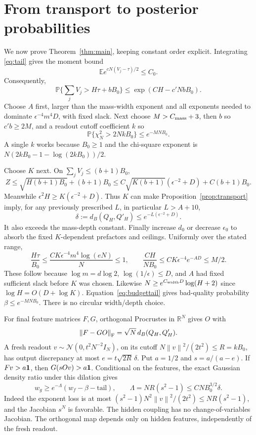 \documentclass[11pt]{article}
\newcommand{\R}{\mathbb R}\newcommand{\E}{\mathbb E}\newcommand{\Pp}{\mathbb P}
\newcommand{\norm}[1]{\left\lVert#1\right\rVert}
\newcommand{\cN}{\mathcal N}\newcommand{\Dist}{\mathsf D}
\begin{document}
\section{From transport to posterior probabilities}\label{sec:finish}
We now prove Theorem~\ref{thm:main}, keeping constant order explicit. Integrating \eqref{eq:tail} gives the moment bound\[\E e^{cN(V_j-\tau)/2}\le C_0.\]Consequently,
\begin{equation}\label{eq:budgettail}
 \Pp\Big\{\sum_jV_j>H\tau+bB_0\Big\}\le\exp(CH-c'NbB_0).
\end{equation}
Choose $A$ first, larger than the mass-width exponent and all exponents needed to dominate $\epsilon^{-4}m^4D$, with fixed slack. Next choose $M>C_{\rm mass}+3$, then $b$ so $c'b\ge2M$, and a readout cutoff coefficient $k$ so
\begin{equation}\label{eq:readtail}
 \Pp\{\chi_N^2>2NkB_0\}\le e^{-MNB_0}.
\end{equation}
A single $k$ works because $B_0\ge1$ and the chi-square exponent is $N(2kB_0-1-\log(2kB_0))/2$.

Choose $K$ next. On $\sum_jV_j\le(b+1)B_0$,
\[
 Z\le\sqrt{H(b+1)B_0}+(b+1)B_0
 \le C\sqrt{K(b+1)}(\epsilon^{-2}+D)+C(b+1)B_0.
\]
Meanwhile $\epsilon^2H\ge K(\epsilon^{-2}+D)$. Thus $K$ can make Proposition~\ref{prop:transport} imply, for any previously prescribed $L$, in particular $L>A+10$,
\begin{equation}\label{eq:delta}
 \delta:=d_B(Q_H,Q'_H)\le e^{-L(\epsilon^{-2}+D)}.
\end{equation}
It also exceeds the mass-depth constant. Finally increase $d_0$ or decrease $\epsilon_0$ to absorb the fixed $K$-dependent prefactors and ceilings. Uniformly over the stated range,
\[
 \frac{H\tau}{B_0}\le\frac{CK\epsilon^{-4}m^4\log(eN)}N\le1,
 \qquad \frac{CH}{NB_0}\le CK\epsilon^{-4}e^{-AD}\le M/2.
\]
These follow because $\log m=d\log2$, $\log(1/\epsilon)\le D$, and $A$ had fixed sufficient slack before $K$ was chosen. Likewise $N\ge e^{C_{\rm width}D}\log(H+2)$ since $\log H=O(D+\log K)$. Equation~\eqref{eq:budgettail} gives bad-quality probability $\beta\le e^{-MNB_0}$. There is no circular width/depth choice.

For final feature matrices $F,G$, orthogonal Procrustes in $\R^N$ gives $O$ with
\begin{equation}
 \norm{F-GO}_\F=\sqrt N\,d_B(Q_H,Q'_H).
\end{equation}
A fresh readout $v\sim\cN(0,t^2N^{-2}I_N)$, on its cutoff $N\norm v^2/(2t^2)\le R=kB_0$, has output discrepancy at most $e=t\sqrt{2R}\,\delta$. Put $a=1/2$ and $s=a/(a-e)$. If $Fv>a\mathbf1$, then $G(sOv)>a\mathbf1$. Conditional on the features, the exact Gaussian density ratio under this dilation gives
\begin{equation}\label{eq:readcomp}
 w_g\ge e^{-\Lambda}(w_f-\beta-\text{tail}),\qquad
 \Lambda=NR(s^2-1)\le CNB_0^{3/2}\delta.
\end{equation}
Indeed the exponent loss is at most $(s^2-1)N^2\norm v^2/(2t^2)\le NR(s^2-1)$, and the Jacobian $s^N$ is favorable. The hidden coupling has no change-of-variables Jacobian. The orthogonal map depends only on hidden features, independently of the fresh readout.
\end{document}
